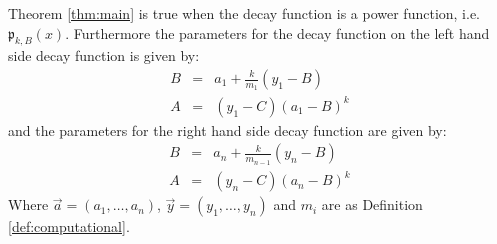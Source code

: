 \documentclass[10pt]{article}
\begin{document}
\begin{theorem}
\label{thm:power}
Theorem \ref{thm:main} is true when the decay function is a power function, i.e.
$\mathfrak{p}_{k,B}(x)$.  Furthermore the parameters for the decay function on the left hand
side decay function is given by:
\begin{eqnarray*}
B&=&a_1 + \frac{k}{m_1}(y_1-B)\\
A&=&(y_1-C)(a_1-B)^k
\end{eqnarray*}
and the parameters for the right hand side decay function are given by:
\begin{eqnarray*}
B&=&a_n + \frac{k}{m_{n-1}}(y_n-B)\\
A&=&(y_n-C)(a_n-B)^k
\end{eqnarray*}
Where $\vec{a}=(a_1, \ldots, a_n)$, $\vec{y}=(y_1,\ldots,y_n)$ and $m_i$ are
as Definition \ref{def:computational}.
\end{theorem}
\end{document}
